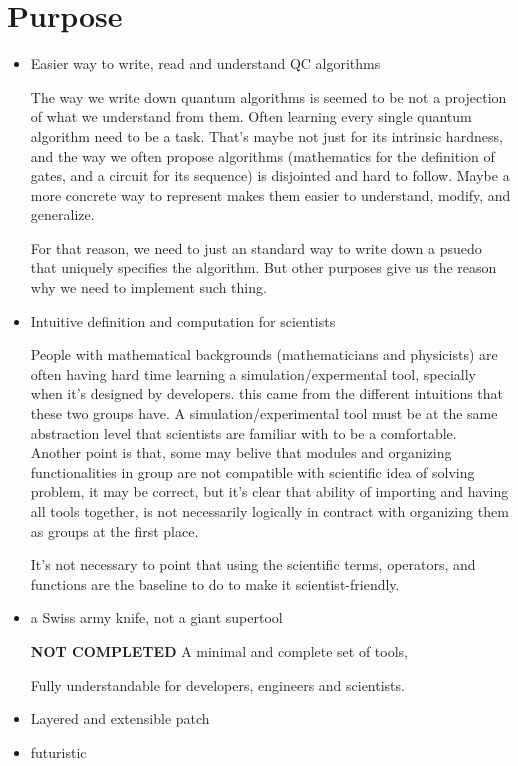 \documentclass[a4paper,11pt]{article}
\begin{document}
\section{Purpose}
\begin{itemize}
\item Easier way to write, read and understand QC algorithms

The way we write down quantum algorithms is seemed to be not a projection of what we understand from them. Often learning every single quantum algorithm need to be a task. That's maybe not just for its intrinsic hardness, and the way we often propose algorithms (mathematics for the definition of gates, and a circuit for its sequence) is disjointed and hard to follow. Maybe a more concrete way to represent makes them easier to understand, modify, and generalize.

For that reason, we need to just an standard way to write down a psuedo that uniquely specifies the algorithm. But other purposes give us the reason why we need to implement such thing.

\item Intuitive definition and computation for scientists

People with mathematical backgrounds (mathematicians and physicists) are often having hard time learning a simulation/expermental tool, specially when it's designed by developers. this came from the different intuitions that these two groups have.
A simulation/experimental tool must be at the same abstraction level that scientists are familiar with to be a comfortable. Another point is that, some may belive that modules and organizing functionalities in group are not compatible with scientific idea of solving problem, it may be correct, but it's clear that ability of importing and having all tools together, is not necessarily logically in contract with organizing them as groups at the first place.

It's not necessary to point that using the scientific terms, operators, and functions are the baseline to do to make it scientist-friendly.

\item a Swiss army knife, not a giant supertool

\textbf{NOT COMPLETED}
A minimal and complete set of tools,

Fully understandable for developers, engineers and scientists.

\item Layered and extensible patch

\item futuristic
\end{itemize}
\end{document}
